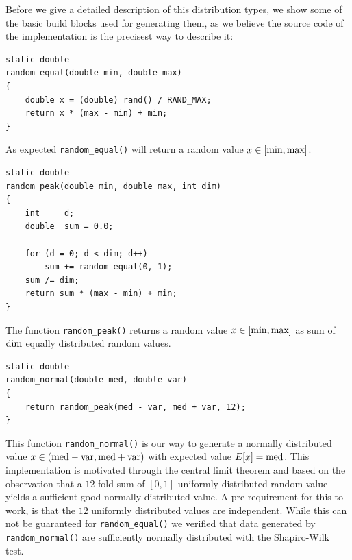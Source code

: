 
Before we give a detailed description of this distribution types, we
show some of the basic build blocks used for generating them, as we
believe the source code of the implementation is the precisest way to
describe it:

\begin{lstlisting}
static double
random_equal(double min, double max)
{
	double x = (double) rand() / RAND_MAX;
	return x * (max - min) + min;
}
\end{lstlisting}

As expected \lstinline{random_equal()} will return a random value $x
\in [\textnormal{min}, \textnormal{max}]$.

\begin{lstlisting}
static double
random_peak(double min, double max, int dim)
{
	int		d;
	double	sum = 0.0;

	for (d = 0; d < dim; d++)
		sum += random_equal(0, 1);
	sum /= dim;
	return sum * (max - min) + min;
}
\end{lstlisting}

The function \lstinline{random_peak()} returns a random value $x \in
[\textnormal{min}, \textnormal{max}]$ as sum of $\textnormal{dim}$
equally distributed random values.

\begin{lstlisting}
static double
random_normal(double med, double var)
{
	return random_peak(med - var, med + var, 12);
}
\end{lstlisting}

This function \lstinline{random_normal()} is our way to generate a
normally distributed value $x \in (\textnormal{med} -
\textnormal{var}, \textnormal{med} + \textnormal{var})$ with expected
value $E[x] = \textnormal{med}$.
%
This implementation is motivated through the central limit theorem and
based on the observation that a $12$-fold sum of $[0,1]$ uniformly
distributed random value yields a sufficient good normally distributed
value. A pre-requirement for this to work, is that the $12$ uniformly
distributed values are independent. While this can not be guaranteed
for \lstinline{random_equal()} we verified that data generated by
\lstinline{random_normal()} are sufficiently normally distributed with
the Shapiro-Wilk test.

